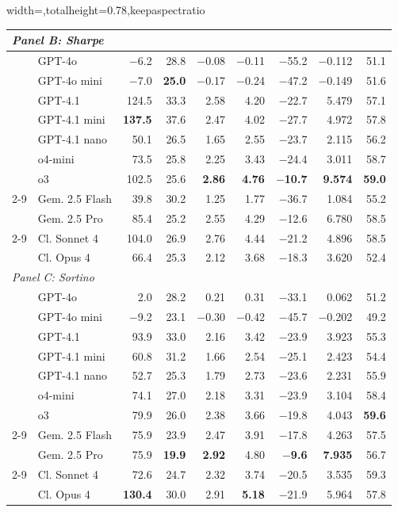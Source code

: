 \begin{table}[H]
\begin{adjustbox}{width=\textwidth,totalheight=0.78\textheight,keepaspectratio}
\begin{tabular}{ll rrrrrrr}
\midrule
\multicolumn{9}{l}{\textit{Panel B: Sharpe}} \\
\midrule
& GPT-4o & $-$6.2 & 28.8 & $-$0.08 & $-$0.11 & $-$55.2 & $-$0.112 & 51.1 \\
& GPT-4o mini & $-$7.0 & \textbf{25.0} & $-$0.17 & $-$0.24 & $-$47.2 & $-$0.149 & 51.6 \\
& GPT-4.1 & 124.5 & 33.3 & 2.58 & 4.20 & $-$22.7 & 5.479 & 57.1 \\
& GPT-4.1 mini & \textbf{137.5} & 37.6 & 2.47 & 4.02 & $-$27.7 & 4.972 & 57.8 \\
& GPT-4.1 nano & 50.1 & 26.5 & 1.65 & 2.55 & $-$23.7 & 2.115 & 56.2 \\
& o4-mini & 73.5 & 25.8 & 2.25 & 3.43 & $-$24.4 & 3.011 & 58.7 \\
& o3 & 102.5 & 25.6 & \textbf{2.86} & \textbf{4.76} & \textbf{$-$10.7} & \textbf{9.574} & \textbf{59.0} \\
\cmidrule(l){2-9}
& Gem. 2.5 Flash & 39.8 & 30.2 & 1.25 & 1.77 & $-$36.7 & 1.084 & 55.2 \\
& Gem. 2.5 Pro & 85.4 & 25.2 & 2.55 & 4.29 & $-$12.6 & 6.780 & 58.5 \\
\cmidrule(l){2-9}
& Cl. Sonnet 4 & 104.0 & 26.9 & 2.76 & 4.44 & $-$21.2 & 4.896 & 58.5 \\
& Cl. Opus 4 & 66.4 & 25.3 & 2.12 & 3.68 & $-$18.3 & 3.620 & 52.4 \\
\midrule
\multicolumn{9}{l}{\textit{Panel C: Sortino}} \\
\midrule
& GPT-4o & 2.0 & 28.2 & 0.21 & 0.31 & $-$33.1 & 0.062 & 51.2 \\
& GPT-4o mini & $-$9.2 & 23.1 & $-$0.30 & $-$0.42 & $-$45.7 & $-$0.202 & 49.2 \\
& GPT-4.1 & 93.9 & 33.0 & 2.16 & 3.42 & $-$23.9 & 3.923 & 55.3 \\
& GPT-4.1 mini & 60.8 & 31.2 & 1.66 & 2.54 & $-$25.1 & 2.423 & 54.4 \\
& GPT-4.1 nano & 52.7 & 25.3 & 1.79 & 2.73 & $-$23.6 & 2.231 & 55.9 \\
& o4-mini & 74.1 & 27.0 & 2.18 & 3.31 & $-$23.9 & 3.104 & 58.4 \\
& o3 & 79.9 & 26.0 & 2.38 & 3.66 & $-$19.8 & 4.043 & \textbf{59.6} \\
\cmidrule(l){2-9}
& Gem. 2.5 Flash & 75.9 & 23.9 & 2.47 & 3.91 & $-$17.8 & 4.263 & 57.5 \\
& Gem. 2.5 Pro & 75.9 & \textbf{19.9} & \textbf{2.92} & 4.80 & \textbf{$-$9.6} & \textbf{7.935} & 56.7 \\
\cmidrule(l){2-9}
& Cl. Sonnet 4 & 72.6 & 24.7 & 2.32 & 3.74 & $-$20.5 & 3.535 & 59.3 \\
& Cl. Opus 4 & \textbf{130.4} & 30.0 & 2.91 & \textbf{5.18} & $-$21.9 & 5.964 & 57.8 \\
\bottomrule
\end{tabular}
\end{adjustbox}
\end{table}

